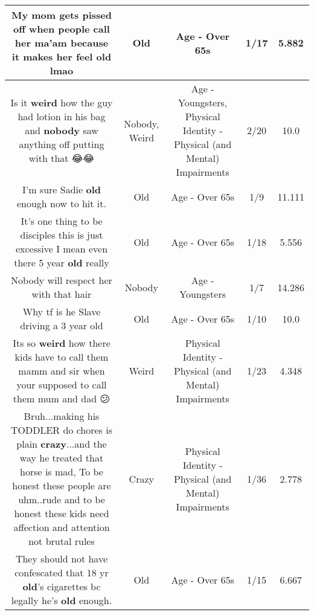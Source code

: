\documentclass[11pt]{article}
\newlength\mylength
\begin{document}
\begin{center}
\begin{longtable}{|C{.65\mylength}|C{.30\mylength}|C{.12\mylength}|C{.12\mylength}|C{.12\mylength}|}
  \small My mom gets pissed off when people call her ma'am because it makes her feel \textbf{old} lmao\normalsize   & Old & Age - Over 65s & 1/17 & 5.882 \\  \hline
  \small Is it \textbf{weird} how the guy had lotion in his bag and \textbf{nobody} saw anything off putting with that 😂😂\normalsize   & Nobody, Weird & Age - Youngsters, Physical Identity - Physical (and Mental) Impairments & 2/20 & 10.0 \\  \hline
  \small I'm sure Sadie \textbf{old} enough now to hit it.\normalsize   & Old & Age - Over 65s & 1/9 & 11.111 \\  \hline
  \small It's one thing to be disciples this is just excessive I mean even there 5 year \textbf{old} really\normalsize   & Old & Age - Over 65s & 1/18 & 5.556 \\  \hline
  \small Nobody will respect her with that hair\normalsize   & Nobody & Age - Youngsters & 1/7 & 14.286 \\  \hline
  \small Why tf is he Slave driving a 3 year old\normalsize   & Old & Age - Over 65s & 1/10 & 10.0 \\  \hline
  \small Its so \textbf{weird} how there kids have to call them mamm and sir when your supposed to call them mum and dad 😕\normalsize   & Weird & Physical Identity - Physical (and Mental) Impairments & 1/23 & 4.348 \\  \hline
  \small Bruh...making his TODDLER do chores is plain \textbf{crazy}...and the way he treated that horse is mad, To be honest these people are uhm..rude and to be honest these kids need affection and attention not brutal rules\normalsize   & Crazy & Physical Identity - Physical (and Mental) Impairments & 1/36 & 2.778 \\  \hline
  \small They should not have confescated that 18 yr \textbf{old}'s cigarettes bc legally he's \textbf{old} enough.\normalsize   & Old & Age - Over 65s & 1/15 & 6.667 \\  \hline

\end{longtable}
\end{center}
\end{document}
